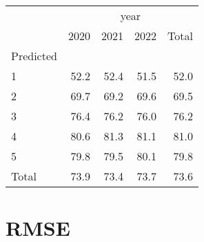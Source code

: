 \documentclass{article}
\begin{document}
\begin{minipage}[b]{.40\textwidth}
\begin{tabular}{lllll}
	\cline{1-5}
	\multicolumn{1}{c}{} &
	\multicolumn{4}{|c}{year} \\
	\multicolumn{1}{c}{} &
	\multicolumn{1}{|r}{2020} &
	\multicolumn{1}{r}{2021} &
	\multicolumn{1}{r}{2022} &
	\multicolumn{1}{r}{Total} \\
	\cline{1-5}
	\multicolumn{1}{l}{Predicted} &
	\multicolumn{1}{|r}{} &
	\multicolumn{1}{r}{} &
	\multicolumn{1}{r}{} &
	\multicolumn{1}{r}{} \\
	\multicolumn{1}{l}{\hspace{1em}1} &
	\multicolumn{1}{|r}{52.2} &
	\multicolumn{1}{r}{52.4} &
	\multicolumn{1}{r}{51.5} &
	\multicolumn{1}{r}{52.0} \\
	\multicolumn{1}{l}{\hspace{1em}2} &
	\multicolumn{1}{|r}{69.7} &
	\multicolumn{1}{r}{69.2} &
	\multicolumn{1}{r}{69.6} &
	\multicolumn{1}{r}{69.5} \\
	\multicolumn{1}{l}{\hspace{1em}3} &
	\multicolumn{1}{|r}{76.4} &
	\multicolumn{1}{r}{76.2} &
	\multicolumn{1}{r}{76.0} &
	\multicolumn{1}{r}{76.2} \\
	\multicolumn{1}{l}{\hspace{1em}4} &
	\multicolumn{1}{|r}{80.6} &
	\multicolumn{1}{r}{81.3} &
	\multicolumn{1}{r}{81.1} &
	\multicolumn{1}{r}{81.0} \\
	\multicolumn{1}{l}{\hspace{1em}5} &
	\multicolumn{1}{|r}{79.8} &
	\multicolumn{1}{r}{79.5} &
	\multicolumn{1}{r}{80.1} &
	\multicolumn{1}{r}{79.8} \\
	\multicolumn{1}{l}{\hspace{1em}Total} &
	\multicolumn{1}{|r}{73.9} &
	\multicolumn{1}{r}{73.4} &
	\multicolumn{1}{r}{73.7} &
	\multicolumn{1}{r}{73.6} \\
	\cline{1-5}
\end{tabular}
\end{minipage}


\section{RMSE}
\end{document}
